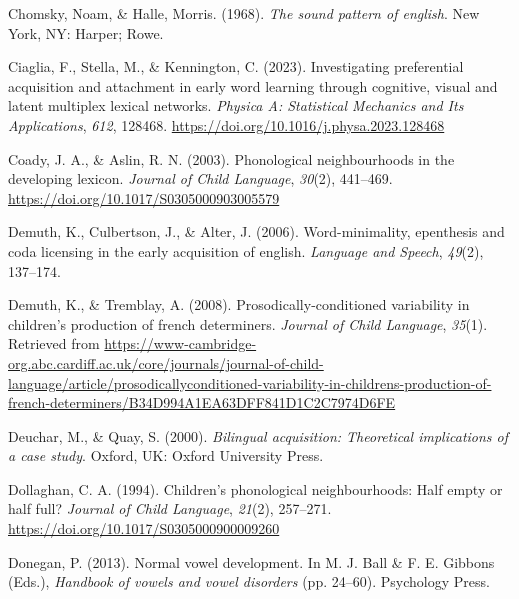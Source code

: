 \documentclass[
  man]{apa6}
\newlength{\cslhangindent}
\newlength{\cslentryspacingunit} %
\newenvironment{CSLReferences}[2] %
 {%
  \setlength{\parindent}{0pt}
  \ifodd #1
  \let\oldpar\par
  \def\par{\hangindent=\cslhangindent\oldpar}
  \fi
  \setlength{\parskip}{#2\cslentryspacingunit}
 }%
 {}
\begin{document}
\begin{CSLReferences}{1}{0}
\leavevmode{}%
Chomsky, Noam, \& Halle, Morris. (1968). \emph{The sound pattern of english}. New York, {NY}: Harper; Rowe.

\leavevmode{}%
Ciaglia, F., Stella, M., \& Kennington, C. (2023). Investigating preferential acquisition and attachment in early word learning through cognitive, visual and latent multiplex lexical networks. \emph{Physica A: Statistical Mechanics and Its Applications}, \emph{612}, 128468. \url{https://doi.org/10.1016/j.physa.2023.128468}

\leavevmode{}%
Coady, J. A., \& Aslin, R. N. (2003). Phonological neighbourhoods in the developing lexicon. \emph{Journal of Child Language}, \emph{30}(2), 441--469. \url{https://doi.org/10.1017/S0305000903005579}

\leavevmode{}%
Demuth, K., Culbertson, J., \& Alter, J. (2006). Word-minimality, epenthesis and coda licensing in the early acquisition of english. \emph{Language and Speech}, \emph{49}(2), 137--174.

\leavevmode{}%
Demuth, K., \& Tremblay, A. (2008). Prosodically-conditioned variability in children's production of french determiners. \emph{Journal of Child Language}, \emph{35}(1). Retrieved from \url{https://www-cambridge-org.abc.cardiff.ac.uk/core/journals/journal-of-child-language/article/prosodicallyconditioned-variability-in-childrens-production-of-french-determiners/B34D994A1EA63DFF841D1C2C7974D6FE}

\leavevmode{}%
Deuchar, M., \& Quay, S. (2000). \emph{Bilingual acquisition: Theoretical implications of a case study}. Oxford, {UK}: Oxford University Press.

\leavevmode{}%
Dollaghan, C. A. (1994). Children's phonological neighbourhoods: Half empty or half full? \emph{Journal of Child Language}, \emph{21}(2), 257--271. \url{https://doi.org/10.1017/S0305000900009260}

\leavevmode{}%
Donegan, P. (2013). Normal vowel development. In M. J. Ball \& F. E. Gibbons (Eds.), \emph{Handbook of vowels and vowel disorders} (pp. 24--60). Psychology Press.


\end{CSLReferences}
\end{document}
